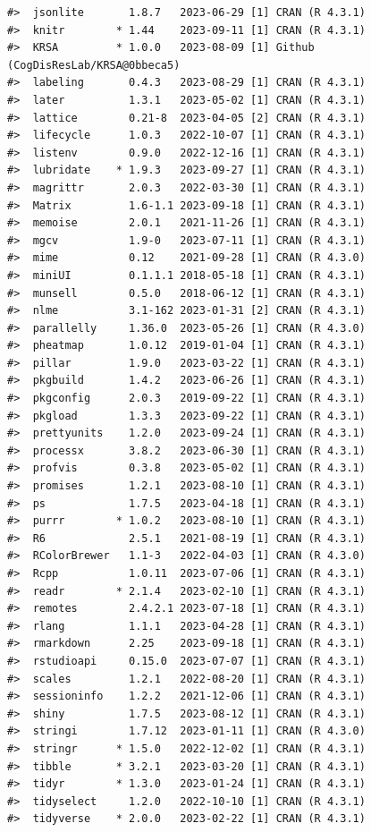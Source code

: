 \documentclass[
  letterpaper,
  DIV=11,
  numbers=noendperiod]{scrreport}
\begin{document}
\begin{verbatim}
#>  jsonlite       1.8.7   2023-06-29 [1] CRAN (R 4.3.1)
#>  knitr        * 1.44    2023-09-11 [1] CRAN (R 4.3.1)
#>  KRSA         * 1.0.0   2023-08-09 [1] Github (CogDisResLab/KRSA@0bbeca5)
#>  labeling       0.4.3   2023-08-29 [1] CRAN (R 4.3.1)
#>  later          1.3.1   2023-05-02 [1] CRAN (R 4.3.1)
#>  lattice        0.21-8  2023-04-05 [2] CRAN (R 4.3.1)
#>  lifecycle      1.0.3   2022-10-07 [1] CRAN (R 4.3.1)
#>  listenv        0.9.0   2022-12-16 [1] CRAN (R 4.3.1)
#>  lubridate    * 1.9.3   2023-09-27 [1] CRAN (R 4.3.1)
#>  magrittr       2.0.3   2022-03-30 [1] CRAN (R 4.3.1)
#>  Matrix         1.6-1.1 2023-09-18 [1] CRAN (R 4.3.1)
#>  memoise        2.0.1   2021-11-26 [1] CRAN (R 4.3.1)
#>  mgcv           1.9-0   2023-07-11 [1] CRAN (R 4.3.1)
#>  mime           0.12    2021-09-28 [1] CRAN (R 4.3.0)
#>  miniUI         0.1.1.1 2018-05-18 [1] CRAN (R 4.3.1)
#>  munsell        0.5.0   2018-06-12 [1] CRAN (R 4.3.1)
#>  nlme           3.1-162 2023-01-31 [2] CRAN (R 4.3.1)
#>  parallelly     1.36.0  2023-05-26 [1] CRAN (R 4.3.0)
#>  pheatmap       1.0.12  2019-01-04 [1] CRAN (R 4.3.1)
#>  pillar         1.9.0   2023-03-22 [1] CRAN (R 4.3.1)
#>  pkgbuild       1.4.2   2023-06-26 [1] CRAN (R 4.3.1)
#>  pkgconfig      2.0.3   2019-09-22 [1] CRAN (R 4.3.1)
#>  pkgload        1.3.3   2023-09-22 [1] CRAN (R 4.3.1)
#>  prettyunits    1.2.0   2023-09-24 [1] CRAN (R 4.3.1)
#>  processx       3.8.2   2023-06-30 [1] CRAN (R 4.3.1)
#>  profvis        0.3.8   2023-05-02 [1] CRAN (R 4.3.1)
#>  promises       1.2.1   2023-08-10 [1] CRAN (R 4.3.1)
#>  ps             1.7.5   2023-04-18 [1] CRAN (R 4.3.1)
#>  purrr        * 1.0.2   2023-08-10 [1] CRAN (R 4.3.1)
#>  R6             2.5.1   2021-08-19 [1] CRAN (R 4.3.1)
#>  RColorBrewer   1.1-3   2022-04-03 [1] CRAN (R 4.3.0)
#>  Rcpp           1.0.11  2023-07-06 [1] CRAN (R 4.3.1)
#>  readr        * 2.1.4   2023-02-10 [1] CRAN (R 4.3.1)
#>  remotes        2.4.2.1 2023-07-18 [1] CRAN (R 4.3.1)
#>  rlang          1.1.1   2023-04-28 [1] CRAN (R 4.3.1)
#>  rmarkdown      2.25    2023-09-18 [1] CRAN (R 4.3.1)
#>  rstudioapi     0.15.0  2023-07-07 [1] CRAN (R 4.3.1)
#>  scales         1.2.1   2022-08-20 [1] CRAN (R 4.3.1)
#>  sessioninfo    1.2.2   2021-12-06 [1] CRAN (R 4.3.1)
#>  shiny          1.7.5   2023-08-12 [1] CRAN (R 4.3.1)
#>  stringi        1.7.12  2023-01-11 [1] CRAN (R 4.3.0)
#>  stringr      * 1.5.0   2022-12-02 [1] CRAN (R 4.3.1)
#>  tibble       * 3.2.1   2023-03-20 [1] CRAN (R 4.3.1)
#>  tidyr        * 1.3.0   2023-01-24 [1] CRAN (R 4.3.1)
#>  tidyselect     1.2.0   2022-10-10 [1] CRAN (R 4.3.1)
#>  tidyverse    * 2.0.0   2023-02-22 [1] CRAN (R 4.3.1)

\end{verbatim}
\end{document}

